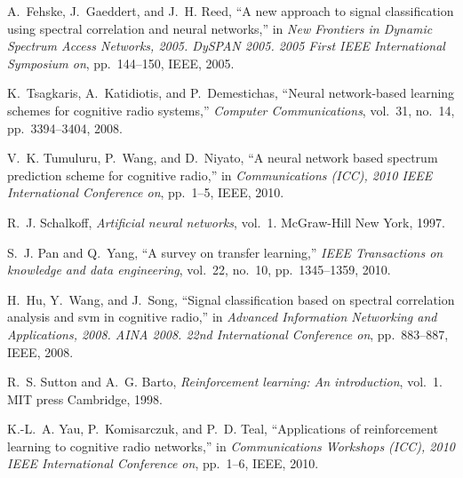 \documentclass[journal]{IEEEtran}
\begin{document}
\begin{thebibliography}{10}
A.~Fehske, J.~Gaeddert, and J.~H. Reed, ``A new approach to signal
  classification using spectral correlation and neural networks,'' in {\em New
  Frontiers in Dynamic Spectrum Access Networks, 2005. DySPAN 2005. 2005 First
  IEEE International Symposium on}, pp.~144--150, IEEE, 2005.

K.~Tsagkaris, A.~Katidiotis, and P.~Demestichas, ``Neural network-based
  learning schemes for cognitive radio systems,'' {\em Computer
  Communications}, vol.~31, no.~14, pp.~3394--3404, 2008.

V.~K. Tumuluru, P.~Wang, and D.~Niyato, ``A neural network based spectrum
  prediction scheme for cognitive radio,'' in {\em Communications (ICC), 2010
  IEEE International Conference on}, pp.~1--5, IEEE, 2010.

R.~J. Schalkoff, {\em Artificial neural networks}, vol.~1.
\newblock McGraw-Hill New York, 1997.

S.~J. Pan and Q.~Yang, ``A survey on transfer learning,'' {\em IEEE
  Transactions on knowledge and data engineering}, vol.~22, no.~10,
  pp.~1345--1359, 2010.

H.~Hu, Y.~Wang, and J.~Song, ``Signal classification based on spectral
  correlation analysis and svm in cognitive radio,'' in {\em Advanced
  Information Networking and Applications, 2008. AINA 2008. 22nd International
  Conference on}, pp.~883--887, IEEE, 2008.

R.~S. Sutton and A.~G. Barto, {\em Reinforcement learning: An introduction},
  vol.~1.
\newblock MIT press Cambridge, 1998.

K.-L.~A. Yau, P.~Komisarczuk, and P.~D. Teal, ``Applications of reinforcement
  learning to cognitive radio networks,'' in {\em Communications Workshops
  (ICC), 2010 IEEE International Conference on}, pp.~1--6, IEEE, 2010.

\end{thebibliography}

\end{document}
